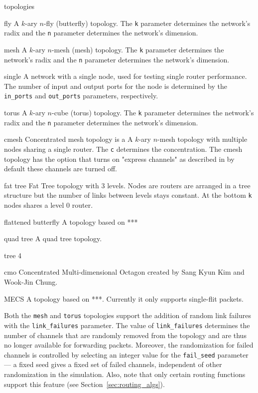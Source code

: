 \documentclass[11pt]{article}
\begin{document}
\begin{opt_list}{topologies}
\item[fly] A $k$-ary $n$-fly (butterfly) topology. The \texttt{k}
parameter determines the network's radix and the \texttt{n} parameter
determines the network's dimension.

\item[mesh] A $k$-ary $n$-mesh (mesh) topology. The \texttt{k}
parameter determines the network's radix and the \texttt{n} parameter determines
the network's dimension.

\item[single] A network with a single node, used for testing single
router performance.  The number of input and output ports for the node
is determined by the \texttt{in\_ports} and \texttt{out\_ports} parameters,
respectively.

\item[torus] A $k$-ary $n$-cube (torus) topology.  The \texttt{k}
parameter determines the network's radix and the \texttt{n} parameter determines
the network's dimension.
\item[cmesh] Concentrated mesh topology is a A $k$-ary $n$-mesh topology with multiple nodes sharing a single router. The \texttt{c} determines the concentration. The cmesh topology has the option that turns on "express channels" as described in  by default these channels are turned off. 

\item[fat tree] Fat Tree topology with 3 levels. Nodes are routers are arranged in a tree structure but the number of links between levels stays constant. At the bottom \texttt{k} nodes shares a level 0 router.

\item[flattened butterfly] A topology based on *** 

\item[quad tree] A quad tree topology.

\item[tree 4]

\item[cmo] Concentrated Multi-dimensional Octagon created by Sang Kyun Kim and Wook-Jin Chung.

\item[MECS] A topology based on ***. Currently it only supports single-flit packets. 

\end{opt_list}

Both the \texttt{mesh} and \texttt{torus} topologies support the
addition of random link failures with the \texttt{link\_failures}
parameter.  The value of \texttt{link\_failures} determines the number
of channels that are randomly removed from the topology and are thus
no longer available for forwarding packets.  Moreover, the
randomization for failed channels is controlled by selecting an
integer value for the \texttt{fail\_seed} parameter --- a fixed seed
gives a fixed set of failed channels, independent of other
randomization in the simulation.  Also, note that only certain routing
functions support this feature (see Section~\ref{sec:routing_algs}).
\end{document}
